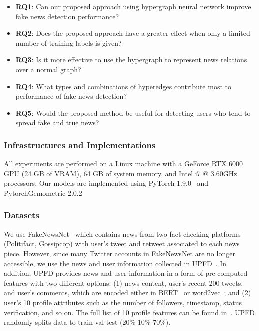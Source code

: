 \documentclass[conference]{IEEEtran}
\begin{document}
\begin{itemize}
    \item \textbf{RQ1}: Can our proposed approach using hypergraph neural network improve fake news detection performance?
    \item \textbf{RQ2}: Does the proposed approach have a greater effect when only a limited number of training labels is given?
    \item \textbf{RQ3}: Is it more effective to use the hypergraph to represent news relations over a normal graph?
    \item \textbf{RQ4}: What types and combinations of hyperedges contribute most to performance of fake news detection?
    \item \textbf{RQ5}: Would the proposed method be useful for detecting users who tend to spread fake and true news?
    \end{itemize}  

\subsubsection{Infrastructures and Implementations}
All experiments are performed on a Linux machine with a GeForce RTX 6000 GPU (24 GB of VRAM), 64 GB of system memory, and Intel i7 @ 3.60GHz processors. Our models are implemented using PyTorch 1.9.0~\cite{paszke2019pytorch} and PytorchGemometric 2.0.2~\cite{fey2019fast}

\label{experiment_setup}
\subsubsection{Datasets}
We use FakeNewsNet~\cite{shu2020fakenewsnet} which contains news from two fact-checking platforms (Politifact, Gossipcop) with user's tweet and retweet associated to each news piece. However, since many Twitter accounts in FakeNewsNet are no longer accessible, we use the news and user information collected in UPFD~\cite{dou2021user}. In addition, UPFD provides news and user information in a form of pre-computed features with two different options: (1) news content, user's recent 200 tweets, and user's comments, which are encoded either in BERT~\cite{devlin2018bert} or word2vec~\cite{honnibal2017spacy}; and (2) user's 10 profile attributes such as the number of followers, timestamp, status verification, and so on. The full list of 10 profile features can be found in~\cite{han2020graph}. UPFD randomly splits data to train-val-test (20\%-10\%-70\%).
\end{document}
